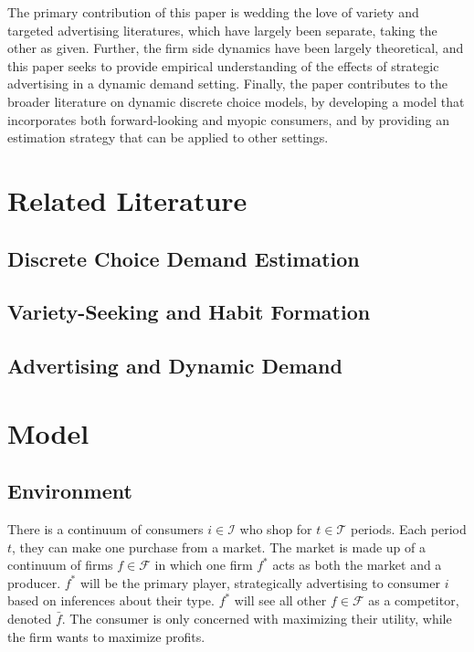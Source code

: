 \documentclass[12pt]{article}
\begin{document}
The primary contribution of this paper is wedding the love of variety and targeted advertising literatures, which have largely been separate, taking the other as given. Further, the firm side dynamics have been largely theoretical, and this paper seeks to provide empirical understanding of the effects of strategic advertising in a dynamic demand setting. Finally, the paper contributes to the broader literature on dynamic discrete choice models, by developing a model that incorporates both forward-looking and myopic consumers, and by providing an estimation strategy that can be applied to other settings.

\section{Related Literature}

    \subsection{Discrete Choice Demand Estimation}

    \subsection{Variety-Seeking and Habit Formation}

    \subsection{Advertising and Dynamic Demand}

\section{Model}

    \subsection{Environment}
    There is a continuum of consumers $i\in\mathcal{I}$ who shop for $t\in\mathcal{T}$ periods. Each period $t$, they can make one purchase from a market. The market is made up of a continuum of firms $f\in\mathcal{F}$ in which one firm $f^*$ acts as both the market and a producer. $f^*$ will be the primary player, strategically advertising to consumer $i$ based on inferences about their type. $f^*$ will see all other $f\in\mathcal{F}$ as a competitor, denoted $\bar{f}$. The consumer is only concerned with maximizing their utility, while the firm wants to maximize profits.
\end{document}
